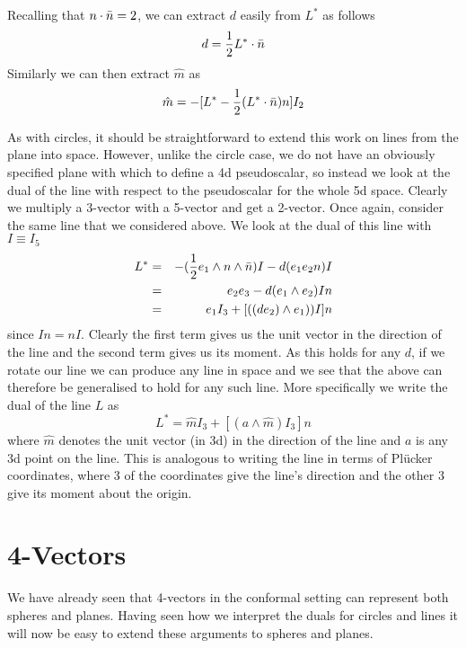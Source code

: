 Recalling that $n\cdot\bar{n}=2$, we can extract $d$ easily
from $L^*$ as follows
%
\begin{equation}
 d = \frac{1}{2} L^*\cdot \bar{n}
\end{equation}
%
Similarly we can then extract $\hat{m}$ as
%
\begin{equation}
   \hat{m} = -[L^* - \frac{1}{2} (L^*\cdot\bar{n})n]I_2
\end{equation}
%

As with circles, it should be straightforward to
extend this work on lines from the plane into space.
However, unlike the circle case, we do not have an
obviously specified plane with which to define a 4d
pseudoscalar, so instead we look at the dual of the line
with respect to the pseudoscalar for the whole 5d space.
Clearly we multiply a 3-vector with a 5-vector and get a
2-vector. Once again, consider the same line that we
considered above.
We look at the dual of this line with $I\equiv I_5$
%
\begin{eqnarray}
L^* & = & -(\frac{1}{2} e_1\wedge n\wedge \bar{n})I - d(e_1 e_2 n)I
\nonumber \\
    & = &  e_2e_3 - d(e_1\wedge e_2)In \nonumber \\
    & = &  e_1I_3 + [((de_2)\wedge e_1))I]n
\end{eqnarray}
%
since $In=nI$. Clearly the first term gives us the unit
vector in the direction of the line and the second term
gives us its moment. As this holds for any $d$, if we
rotate our line we can produce any line in space and we
see that the above can therefore be generalised to hold
for any such line. More specifically we write the dual
of the line $L$ as
%
\[ L^* = \hat{m} I_3 + [(a \wedge \hat{m})I_3]n  \]
%
where $\hat{m}$ denotes the unit vector (in 3d) in the
direction of the line and $a$ is any 3d point on the
line. This is analogous to writing the line in terms of
Pl\"ucker coordinates, where 3 of the coordinates give
the line's direction and the other 3 give its moment
about the origin.

\section{4-Vectors}

We have already seen that 4-vectors in the conformal
setting can represent both spheres and planes. Having
seen how we interpret the duals for circles and lines it
will now be easy to extend these arguments to spheres and
planes.

